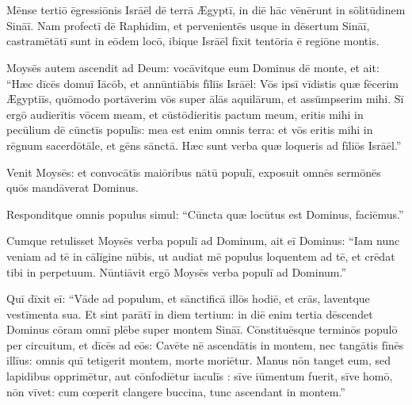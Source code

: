 \chapter{}


\thispagestyle{empty}

Mēnse tertiō ēgressiōnis Isrāēl dē
terrā Ægyptī, in diē hāc vēnērunt in sōlitūdinem Sināī. 
 Nam profectī dē Raphidim, et pervenientēs usque in dēsertum Sināī,
castramētātī sunt in eōdem locō, ibique
Isrāēl fīxit tentōria ē regiōne montis. 

Moysēs autem ascendit ad Deum: vocāvitque eum Dominus dē
monte, et ait: ``Hæc dīcēs domuī Iācōb, et
annūntiābis fīliīs Isrāēl: 
Vōs ipsī vīdistis quæ fēcerim
Ægyptiīs, quōmodo portāverim vōs super ālās aquilārum, et assūmpserim mihi.
Sī ergō audierītis vōcem meam, et cūstōdieritis pactum meum, eritis mihi in pecūlium dē
cūnctīs populīs: mea est enim omnis terra: 
et vōs eritis mihi in
rēgnum sacerdōtāle, et gēns
sānctā. Hæc sunt verba quæ loqueris ad fīliōs
Isrāēl.''

Venit Moysēs: et convocātīs maiōribus nātū populī, exposuit
omnēs sermōnēs quōs mandāverat Dominus. 

Responditque omnis populus simul: ``Cūncta quæ
locūtus est Dominus, faciēmus.''

Cumque retulisset Moysēs verba populī ad
Dominum, ait eī Dominus: ``Iam nunc veniam ad tē in
cālīgine nūbis, ut audiat mē populus loquentem ad tē, et
crēdat tibi in perpetuum. Nūntiāvit ergō Moysēs verba populī ad Dominum.''

Quī dīxit eī: ``Vāde ad populum, et sānctificā illōs hodiē, et crās, laventque vestīmenta sua. 
Et sint parātī in diem tertium: in diē enim tertia dēscendet Dominus cōram
omnī plēbe super montem Sināī. 
Cōnstituēsque terminōs populō per circuitum, et dīcēs ad eōs: Cavēte nē
ascendātis in montem, nec tangātis fīnēs illīus: omnis quī tetigerit
montem, morte moriētur. 
Manus nōn tanget eum, sed
lapidibus opprimētur, aut cōnfodiētur iaculīs
: sīve iūmentum fuerit, sīve homō, nōn vīvet: cum cœperit
clangere buccina, tunc ascendant in montem.''

